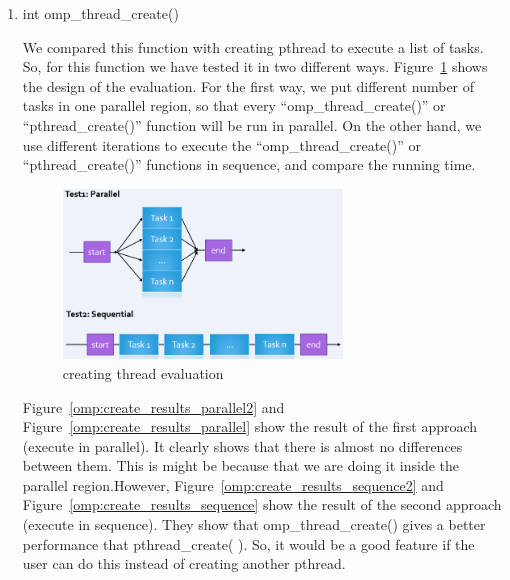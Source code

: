 {\begin{enumerate}
	
	\item int omp{\_}thread{\_}create()
	
	We compared this function with creating pthread to execute a list of tasks. So, for this function we have tested it in two different ways. Figure~\ref{omp:create_evaluation} shows the design of the evaluation. For the first way, we put different number of tasks in one parallel region, so that every “omp{\_}thread{\_}create()” or “pthread{\_}create()” function will be run in parallel. On the other hand, we use different iterations to execute the “omp{\_}thread{\_}create()” or “pthread{\_}create()” functions in sequence, and compare the running time. 
	
	\begin{figure}
		\centering
		\includegraphics[width=0.7\textwidth] {images/create_evaluation}
		\caption{creating thread evaluation}
		\label{omp:create_evaluation}
	\end{figure}
	
	Figure~\ref{omp:create_results_parallel2} and Figure~\ref{omp:create_results_parallel} show the result of the first approach (execute in parallel). It clearly shows that there is almost no differences between them. This is might be because that we are doing it inside the parallel region.However, Figure~\ref{omp:create_results_sequence2} and Figure~\ref{omp:create_results_sequence} show the result of the second approach (execute in sequence). They show that omp{\_}thread{\_}create() gives a better performance that pthread{\_}create( ). So, it would be a good feature if the user can do this instead of creating another pthread.


\end{enumerate}}
